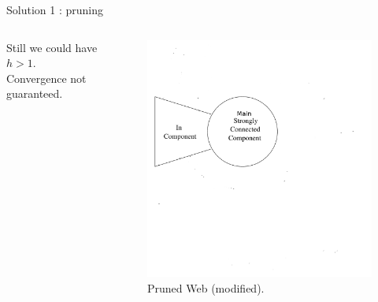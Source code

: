 \documentclass[10pt]{beamer}
\begin{document}
\begin{frame}[allowframebreaks]{Solution 1 : pruning}
\begin{columns}
\begin{column}{0.5\textwidth}
      Still we could have $h > 1$. Convergence not guaranteed.
    \end{column}
    \begin{column}{0.5\textwidth}
      \begin{figure}
        \includegraphics[trim=.5cm 0cm .2cm 0cm,clip,width=\linewidth]{web-graph-pruned.png}
        \caption{Pruned Web \cite[p.~187]{leskovec2014mining} (modified).}
        \label{fig:web-graph}
      \end{figure}
    \end{column}
  \end{columns}
\end{frame}
\end{document}
